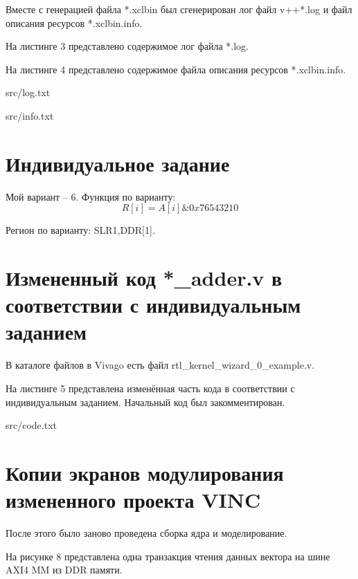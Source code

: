 Вместе с генерацией файла *.xclbin был сгенерирован лог файл v++*.log и файл описания ресурсов *.xclbin.info.

На листинге 3 представлено содержимое лог файла *.log.

На листинге 4 представлено содержимое файла описания ресурсов *.xclbin.info.

\begin{lstinputlisting}[caption=Лог файл v++*.log, 
	basicstyle=\footnotesize\ttfamily, frame=single,breaklines=true]{src/log.txt}
\end{lstinputlisting}

\begin{lstinputlisting}[caption=Файл описания ресурсов *.xclbin.info, 
	basicstyle=\footnotesize\ttfamily, frame=single,breaklines=true]{src/info.txt}
\end{lstinputlisting}

\section*{Индивидуальное задание}
Мой вариант -- 6.
Функция по варианту:
\begin{equation}
R[i] = A[i] \& 0x76543210
\end{equation}

Регион по варианту: SLR1,DDR[1].

\section*{Измененный код *\_adder.v в соответствии с индивидуальным заданием}
В каталоге файлов в Vivago есть файл rtl\_kernel\_wizard\_0\_example.v. 

На листинге 5 представлена изменённая часть кода в соответствии с индивидуальным заданием.
Начальный код был закомментирован.

\begin{lstinputlisting}[caption=Изменённый код *adder.v, 
	basicstyle=\footnotesize\ttfamily, frame=single, breaklines=true]{src/code.txt}
\end{lstinputlisting}

\section*{Копии экранов модулирования измененного проекта VINC}
После этого было заново проведена сборка ядра и моделирование.

На рисунке 8 представлена одна транзакция чтения данных вектора на шине AXI4 MM из DDR памяти.

